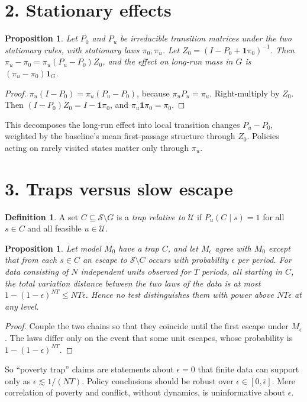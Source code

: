 \documentclass[11pt]{article}
\newtheorem{proposition}[theorem]{Proposition}
\theoremstyle{definition}
\newtheorem{definition}[theorem]{Definition}
\begin{document}
\section*{2. Stationary effects}
\begin{proposition}\label{prop:pert}
Let $P_0$ and $P_u$ be irreducible transition matrices under the two stationary rules, with stationary laws $\pi_0,\pi_u$.
Let $Z_0=(I-P_0+\mathbf 1\pi_0)^{-1}$. Then $\pi_u-\pi_0=\pi_u(P_u-P_0)Z_0$, and the effect on long-run mass in $G$ is
$(\pi_u-\pi_0)\mathbf 1_G$.
\end{proposition}
\begin{proof}
$\pi_u(I-P_0)=\pi_u(P_u-P_0)$, because $\pi_uP_u=\pi_u$. Right-multiply by $Z_0$. Then
$(I-P_0)Z_0=I-\mathbf 1\pi_0$, and $\pi_u\mathbf 1\pi_0=\pi_0$.
\end{proof}
This decomposes the long-run effect into local transition changes $P_u-P_0$, weighted by the baseline's mean
first-passage structure through $Z_0$. Policies acting on rarely visited states matter only through $\pi_u$.

\section*{3. Traps versus slow escape}
\begin{definition}
A set $C\subseteq\mathcal S\setminus G$ is a \emph{trap relative to $\mathcal U$} if $P_u(C\mid s)=1$ for all $s\in C$ and all
feasible $u\in\mathcal U$.
\end{definition}
\begin{proposition}\label{prop:trap}
Let model $M_0$ have a trap $C$, and let $M_\epsilon$ agree with $M_0$ except that from each $s\in C$ an escape to
$\mathcal S\setminus C$ occurs with probability $\epsilon$ per period. For data consisting of $N$ independent units observed
for $T$ periods, all starting in $C$, the total variation distance between the two laws of the data is at most
$1-(1-\epsilon)^{NT}\le NT\epsilon$. Hence no test distinguishes them with power above $NT\epsilon$ at any level.
\end{proposition}
\begin{proof}
Couple the two chains so that they coincide until the first escape under $M_\epsilon$. The laws differ only on the event that
some unit escapes, whose probability is $1-(1-\epsilon)^{NT}$.
\end{proof}
So ``poverty trap'' claims are statements about $\epsilon=0$ that finite data can support only as $\epsilon\lesssim1/(NT)$.
Policy conclusions should be robust over $\epsilon\in[0,\bar\epsilon]$. Mere correlation of poverty and conflict, without
dynamics, is uninformative about $\epsilon$.
\end{document}
